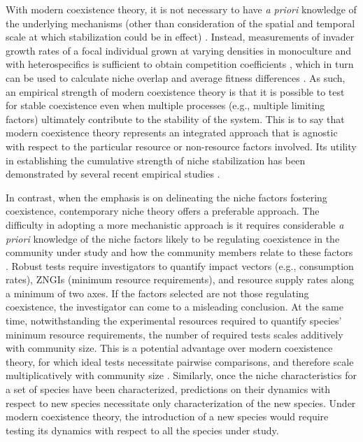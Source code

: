 With modern coexistence theory, it is not necessary to have \textit{a priori} knowledge of the underlying mechanisms (other than consideration of the spatial and temporal scale at which stabilization could be in effect) \citep{Hillerislambers2012}. Instead, measurements of invader growth rates of a focal individual grown at varying densities in monoculture and with heterospecifics is sufficient to obtain competition coefficients \citep{inouye2001}, which in turn can be used to calculate niche overlap and average fitness differences \citep{Chesson2013ecosys, Godoy2014}. As such, an empirical strength of modern coexistence theory is that it is possible to test for stable coexistence even when multiple processes (e.g., multiple limiting factors) ultimately contribute to the stability of the system. This is to say that modern coexistence theory represents an integrated approach that is agnostic with respect to the particular resource or non-resource factors involved. Its utility in establishing the cumulative strength of niche stabilization has been demonstrated by several recent empirical studies \citep[e.g.,][]{Sears2007, Levine2009, Adler2010, Godoy2014}. 
\par


In contrast, when the emphasis is on delineating the niche factors fostering coexistence, contemporary niche theory offers a preferable approach. The difficulty in adopting a more mechanistic approach is it requires considerable \textit{a priori} knowledge of the niche factors likely to be regulating coexistence in the community under study and how the community members relate to these factors \citep{Hillerislambers2012}. Robust tests require investigators to quantify impact vectors (e.g., consumption rates), ZNGIs (minimum resource requirements), and resource supply rates along a minimum of two axes. If the factors selected are not those regulating coexistence, the investigator can come to a misleading conclusion. At the same time, notwithstanding the experimental resources required to quantify species' minimum resource requirements, the number of required tests scales additively with community size. This is a potential advantage over modern coexistence theory, for which ideal tests necessitate pairwise comparisons, and therefore scale multiplicatively with community size \citep[but see][for an approach for multispecies competition]{Carroll2011}. Similarly, once the niche characteristics for a set of species have been characterized, predictions on their dynamics with respect to new species necessitate only characterization of the new species. Under modern coexistence theory, the introduction of a new species would require testing its dynamics with respect to all the species under study. 
\par


